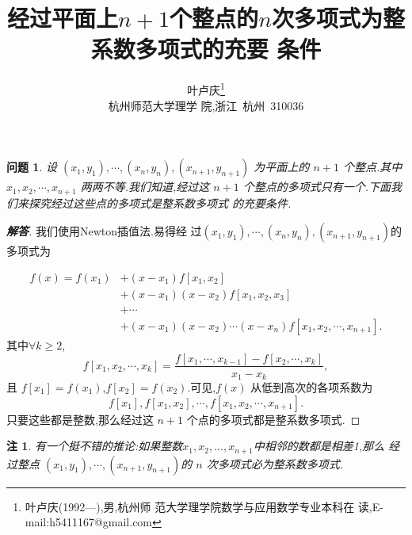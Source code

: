 \documentclass[twoside,11pt]{article}
\newtheorem{question}{问题}
\newtheorem{remark}{注}
\begin{document}
\title{\huge{\bf{经过平面上$n+1$个整点的$n$次多项式为整系数多项式的充要
      条件}}} \author{\small{叶卢庆\footnote{叶卢庆(1992---),男,杭州师
      范大学理学院数学与应用数学专业本科在
      读,E-mail:h5411167@gmail.com}}\\{\small{杭州师范大学理学
      院,浙江~杭州~310036}}} \date{}
\maketitle




\vspace{30pt} %

\begin{question}
  设 $(x_1,y_1),\cdots,(x_n,y_{n}),(x_{n+1},y_{n+1})$ 为平面上的 $n+1$
  个整点.其中 $x_1,x_2,\cdots,x_{n+1}$ 两两不等.我们知道,经过这 $n+1$
  个整点的多项式只有一个.下面我们来探究经过这些点的多项式是整系数多项式
  的充要条件.
\end{question}
\begin{proof}[\bf{解答}]
  我们使用Newton插值法.易得经
  过$(x_1,y_1),\cdots,(x_n,y_{n}),(x_{n+1},y_{n+1})$的多项式为

\begin{align*}
  f(x)=f(x_1)&+(x-x_1)f[x_1,x_2]\\&+(x-x_1)(x-x_2)f[x_1,x_2,x_3]\\&+\cdots\\&+(x-x_1)(x-x_2)\cdots
  (x-x_{n})f[x_1,x_2,\cdots,x_{n+1}].
\end{align*}
其中$\forall k\geq 2$,
$$f[x_1,x_2,\cdots,x_k]=\frac{f[x_1,\cdots,x_{k-1}]-f[x_2,\cdots,x_k]}{x_1-x_k},$$
且 $f[x_1]=f(x_1)$,$f[x_2]=f(x_2)$.可见,$f(x)$ 从低到高次的各项系数为
$$
f[x_1],f[x_1,x_2],\cdots,f[x_1,x_2,\cdots,x_{n+1}].
$$
只要这些都是整数,那么经过这 $n+1$ 个点的多项式都是整系数多项式.
\end{proof}
\begin{remark}
  有一个挺不错的推论:如果整数$x_1,x_2,...,x_{n+1}$中相邻的数都是相差1,那么
  经过整点 $(x_1,y_1),\cdots,(x_{n+1},y_{n+1})$的 $n$ 次多项式必为整系数多项式.
\end{remark}
\end{document}

